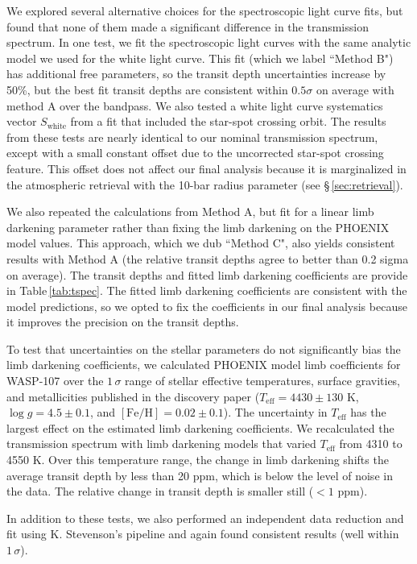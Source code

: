 \documentclass[twocolumn, trackchanges]{aastex61}
\begin{document}
We explored several alternative choices for the spectroscopic light curve fits, but found that none of them made a significant difference in the transmission spectrum. In one test, we fit the spectroscopic light curves with the same analytic model we used for the white light curve. This fit (which we label ``Method B") has additional free parameters, so the transit depth uncertainties increase by 50\%, but the best fit transit depths are consistent within $0.5\sigma$ on average with method A over the bandpass. We also tested a white light curve systematics vector $S_\mathrm{white}$ from a fit that included the star-spot crossing orbit. The results from these tests are nearly identical to our nominal transmission spectrum, except with a small constant offset due to the uncorrected star-spot crossing feature. This offset does not affect our final analysis because it is marginalized in the atmospheric retrieval with the 10-bar radius parameter (see \S\,\ref{sec:retrieval}). 

We also repeated the calculations from Method A, but fit for a linear limb darkening parameter rather than fixing the limb darkening on the PHOENIX model values. This approach, which we dub ``Method C", also yields consistent results with Method A (the relative transit depths agree to better than 0.2 sigma on average). The transit depths and fitted limb darkening coefficients are provide in Table\,\ref{tab:tspec}. The fitted limb darkening coefficients are consistent with the model predictions, so we opted to fix the coefficients in our final analysis because it improves the precision on the transit depths.  

To test that uncertainties on the stellar parameters do not significantly bias the limb darkening coefficients, we calculated PHOENIX model limb coefficients for WASP-107 over the $1\,\sigma$ range of stellar effective temperatures, surface gravities, and metallicities published in the discovery paper ($T_\mathrm{eff} = 4430\pm130$ K, $\log g = 4.5 \pm 0.1$, and $[\mathrm{Fe/H}] = 0.02 \pm 0.1$). The uncertainty in $T_\mathrm{eff}$ has the largest effect on the estimated limb darkening coefficients. We recalculated the transmission spectrum with limb darkening models that varied $T_\mathrm{eff}$ from 4310 to 4550 K. Over this temperature range, the change in limb darkening shifts the average transit depth by less than 20 ppm, which is below the level of noise in the data.  The relative change in transit depth is smaller still ($< 1$ ppm).

In addition to these tests, we also performed an independent data reduction and fit using K. Stevenson's pipeline and again found consistent results (well within $1\,\sigma$). 
\end{document}
